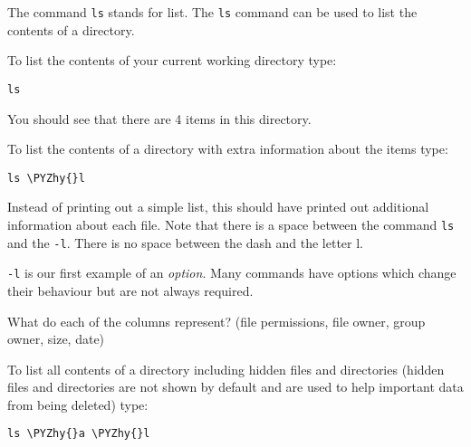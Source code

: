\documentclass[11pt]{article}
\makeatletter
\def\PYZhy{\char`\-}
\newcommand{\boxspacing}{\kern\kvtcb@left@rule\kern\kvtcb@boxsep}
\newcommand{\prompt}[4]{
        {\ttfamily\llap{{\color{blue}\LARGE\faKeyboardO\hspace{3pt}#4}}\vspace{-\baselineskip}}
    }
\makeatother
\begin{document}
The command \texttt{ls} stands for list. The \texttt{ls} command can be
used to list the contents of a directory.

To list the contents of your current working directory type:

    \begin{tcolorbox}[breakable, size=fbox, boxrule=1pt, pad at break*=1mm,colback=cellbackground, colframe=cellborder]
\prompt{In}{incolor}{ }{\boxspacing}
\begin{Verbatim}[commandchars=\\\{\}]
ls
\end{Verbatim}
\end{tcolorbox}

    You should see that there are 4 items in this directory.

To list the contents of a directory with extra information about the
items type:

    \begin{tcolorbox}[breakable, size=fbox, boxrule=1pt, pad at break*=1mm,colback=cellbackground, colframe=cellborder]
\prompt{In}{incolor}{ }{\boxspacing}
\begin{Verbatim}[commandchars=\\\{\}]
ls \PYZhy{}l
\end{Verbatim}
\end{tcolorbox}

    Instead of printing out a simple list, this should have printed out
additional information about each file. Note that there is a space
between the command \texttt{ls} and the \texttt{-l}. There is no space
between the dash and the letter l.

\texttt{-l} is our first example of an \textit{option}. Many commands have
options which change their behaviour but are not always required.

What do each of the columns represent? (file permissions, file owner,
group owner, size, date)

    To list all contents of a directory including hidden files and
directories (hidden files and directories are not shown by default and
are used to help important data from being deleted) type:

    \begin{tcolorbox}[breakable, size=fbox, boxrule=1pt, pad at break*=1mm,colback=cellbackground, colframe=cellborder]
\prompt{In}{incolor}{ }{\boxspacing}
\begin{Verbatim}[commandchars=\\\{\}]
ls \PYZhy{}a \PYZhy{}l
\end{Verbatim}
\end{tcolorbox}
\end{document}
